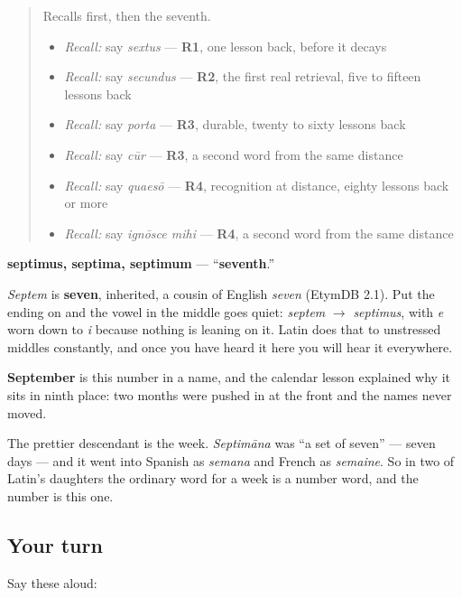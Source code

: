 \label{lesson:LA-C56-septimus}



\begin{quote}
Recalls first, then the seventh.

\begin{itemize}
\raggedright
  \item \emph{Recall:} say \emph{sextus} — \textbf{R1}, one lesson back, before it decays
  \item \emph{Recall:} say \emph{secundus} — \textbf{R2}, the first real retrieval, five to fifteen lessons back
  \item \emph{Recall:} say \emph{porta} — \textbf{R3}, durable, twenty to sixty lessons back
  \item \emph{Recall:} say \emph{cūr} — \textbf{R3}, a second word from the same distance
  \item \emph{Recall:} say \emph{quaesō} — \textbf{R4}, recognition at distance, eighty lessons back or more
  \item \emph{Recall:} say \emph{ignōsce mihi} — \textbf{R4}, a second word from the same distance
\end{itemize}
\end{quote}

\begin{cousinweb}
\textbf{septimus, septima, septimum} — \textquotedblleft{}\textbf{seventh}.\textquotedblright{}

\emph{Septem} is \textbf{seven}, inherited, a cousin of English \emph{seven} (EtymDB 2.1). Put the ending on and the vowel in the middle goes quiet: \emph{septem} $\to$ \emph{septimus}, with \emph{e} worn down to \emph{i} because nothing is leaning on it. Latin does that to unstressed middles constantly, and once you have heard it here you will hear it everywhere.

\textbf{September} is this number in a name, and the calendar lesson explained why it sits in ninth place: two months were pushed in at the front and the names never moved.

The prettier descendant is the week. \emph{Septimāna} was \textquotedblleft{}a set of seven\textquotedblright{} — seven days — and it went into Spanish as \emph{semana} and French as \emph{semaine}. So in two of Latin's daughters the ordinary word for a week is a number word, and the number is this one.
\end{cousinweb}

\subsection*{Your turn}
Say these aloud:

